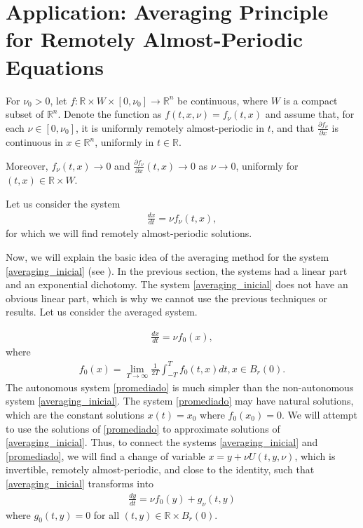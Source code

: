 \documentclass[english,reqno]{amsart}
\numberwithin{equation}{section}
\theoremstyle{plain}
\theoremstyle{definition}
\theoremstyle{remark}
\begin{document}
\section{Application: Averaging Principle for Remotely Almost-Periodic Equations}

For $\nu_0 > 0$, let $f:\mathbb{R}\times W\times [0,\nu_0]\rightarrow \mathbb{R}^n$ be continuous, where $W$ is a compact subset of $\mathbb{R}^n$.  
Denote the function as $f(t,x,\nu)=f_{\nu}(t,x)$ and assume that, for each $\nu\in[0,\nu_0]$, it is uniformly remotely almost-periodic in $t$, and that $\frac{\partial f_{\nu}}{\partial x}$ is continuous in $x\in\mathbb{R}^n$, uniformly in $t\in\mathbb{R}$.

Moreover, $f_{\nu}(t,x)\rightarrow 0$ and $\frac{\partial f_{\nu}}{\partial x}(t,x)\rightarrow 0$ as $\nu\rightarrow 0$, uniformly for $(t,x)\in\mathbb{R}\times W$.
 
Let us consider the system  
\begin{eqnarray}  
\frac{dx}{dt}=\nu f_{\nu}(t,x),\label{averaging_inicial}  
\end{eqnarray}  
for which we will find remotely almost-periodic solutions.

Now, we will explain the basic idea of the averaging method for the system \eqref{averaging_inicial} (see \cite{cheban,krein}).  
In the previous section, the systems had a linear part and an exponential dichotomy. The system \eqref{averaging_inicial} does not have an obvious linear part, which is why we cannot use the previous techniques or results.  
Let us consider the averaged system.

\begin{eqnarray}
\frac{dx}{dt}=\nu f_0(x),\label{promediado}
\end{eqnarray}
where
\begin{eqnarray}
f_0(x)=\lim_{T\rightarrow \infty} \frac{1}{2T}\int_{-T}^{T} f_0(t,x)dt, x\in B_{r}(0). \label{promedio}
\end{eqnarray}
The autonomous system \eqref{promediado} is much simpler than the non-autonomous system \eqref{averaging_inicial}.  
The system \eqref{promediado} may have natural solutions, which are the constant solutions $x(t)=x_0$ where $f_0(x_0)=0$.  
We will attempt to use the solutions of \eqref{promediado} to approximate solutions of \eqref{averaging_inicial}.  
Thus, to connect the systems \eqref{averaging_inicial} and \eqref{promediado}, we will find a change of variable $x=y+\nu U(t,y,\nu)$, which is invertible, remotely almost-periodic, and close to the identity, such that \eqref{averaging_inicial} transforms into
\begin{eqnarray}
\frac{dy}{dt}=\nu f_{0}(y)+g_{\nu}(t,y) \label{after_cambio_variable}
\end{eqnarray}
where $g_0(t,y)=0$ for all $(t,y)\in \mathbb{R}\times B_{r}(0)$.  
\end{document}
